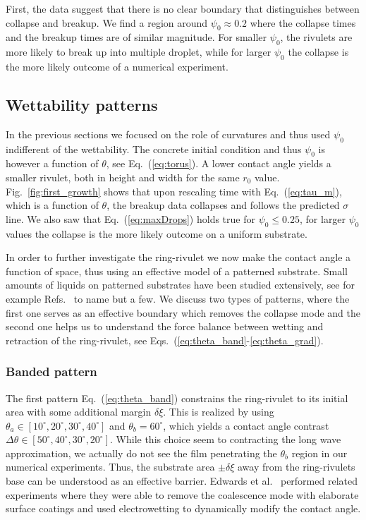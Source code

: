 \documentclass[twoside,twocolumn,9pt]{article}
\begin{document}
First, the data suggest that there is no clear boundary that distinguishes between collapse and breakup.
We find a region around $\psi_0 \approx 0.2$ where the collapse times and the breakup times are of similar magnitude.
For smaller $\psi_0$, the rivulets are more likely to break up into multiple droplet, while for larger $\psi_0$ the collapse is the more likely outcome of a numerical experiment.

\subsection{Wettability patterns}\label{subsec:wettability}
In the previous sections we focused on the role of curvatures and thus used $\psi_0$ indifferent of the wettability. 
The concrete initial condition and thus $\psi_0$ is however a function of $\theta$, see Eq.~(\ref{eq:torus}).
A lower contact angle yields a smaller rivulet, both in height and width for the same $r_0$ value.
Fig.~\ref{fig:first_growth} shows that upon rescaling time with Eq.~(\ref{eq:tau_m}), which is a function of $\theta$, the breakup data collapses and follows the predicted $\sigma$ line.
We also saw that Eq.~(\ref{eq:maxDrops}) holds true for $\psi_0 \leq 0.25$, for larger $\psi_0$ values the collapse is the more likely outcome on a uniform substrate.

In order to further investigate the ring-rivulet we now make the contact angle a function of space, thus using an effective model of a patterned substrate. 
Small amounts of liquids on patterned substrates have been studied extensively, see for example Refs.~\cite{savvaDropletMotionInclined2013, vellingiriDropletSpreadingChemically2011, wangWettingEffectPatterned2023, wuInvestigationEquilibriumDroplet2019} to name but a few.
We discuss two types of patterns, where the first one serves as an effective boundary which removes the collapse mode and the second one helps us to understand the force balance between wetting and retraction of the ring-rivulet, see Eqs.~(\ref{eq:theta_band}-\ref{eq:theta_grad}).

\subsubsection{Banded pattern}\label{subsubsec:banded}
The first pattern Eq.~(\ref{eq:theta_band}) constrains the ring-rivulet to its initial area with some additional margin $\delta\xi$.
This is realized by using $\theta_a \in [10^{\circ}, 20^{\circ}, 30^{\circ}, 40^{\circ}]$ and $\theta_b = 60^{\circ}$, which yields a contact angle contrast $\Delta\theta \in [50^{\circ}, 40^{\circ}, 30^{\circ}, 20^{\circ}]$.
While this choice seem to contracting the long wave approximation, we actually do not see the film penetrating the $\theta_b$ region in our numerical experiments.
Thus, the substrate area $\pm\delta\xi$ away from the ring-rivulets base can be understood as an effective barrier. 
Edwards et al.~\cite{edwardsControllingBreakupToroidal2021} performed related experiments where they were able to remove the coalescence mode with elaborate surface coatings and used electrowetting to dynamically modify the contact angle.
\end{document}
